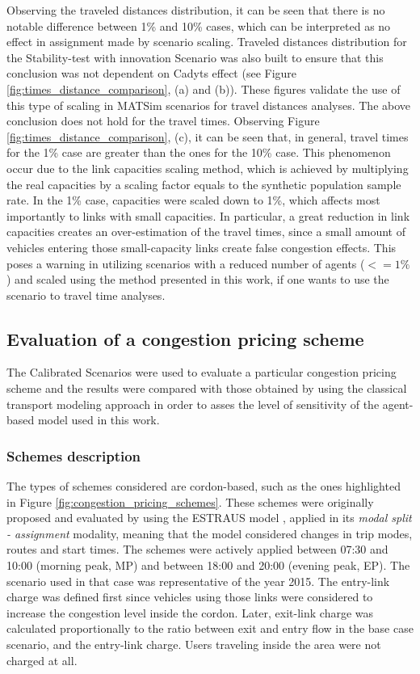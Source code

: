 \documentclass[Journal,letterpaper]{ascelike-new}
\begin{document}
Observing the traveled distances distribution, it can be seen that there is no notable difference between 1\% and 10\% cases, which can be interpreted as no effect in assignment made by scenario scaling. Traveled distances distribution for the Stability-test with innovation Scenario was also built to ensure that this conclusion was not dependent on Cadyts effect (see Figure \ref{fig:times_distance_comparison}, (a) and (b)). These figures validate the use of this type of scaling in MATSim scenarios for travel distances analyses.
The above conclusion does not hold for the travel times. Observing Figure \ref{fig:times_distance_comparison}, (c), it can be seen that, in general, travel times for the 1\% case are greater than the ones for the 10\% case. This phenomenon occur due to the link capacities scaling method, which is achieved by multiplying the real capacities by a scaling factor equals to the synthetic population sample rate. In the 1\% case, capacities were scaled down to 1\%, which affects most importantly to links with small capacities. In particular, a great reduction in link capacities creates an over-estimation of the travel times, since a small amount of vehicles entering those small-capacity links create false congestion effects. This poses a warning in utilizing scenarios with a reduced number of agents ($<=1\%$) and scaled using the method presented in this work, if one wants to use the scenario to travel time analyses.

\subsection{Evaluation of a congestion pricing scheme}

The Calibrated Scenarios were used to evaluate a particular congestion pricing scheme and the results were compared with those obtained by \cite{gleave2009tarificacion} using the classical transport modeling approach in order to asses the level of sensitivity of the agent-based model used in this work.

\subsubsection{Schemes description}
The types of schemes considered are cordon-based, such as the ones highlighted in Figure \ref{fig:congestion_pricing_schemes}. These schemes were originally proposed and evaluated by \cite{gleave2009tarificacion} using the ESTRAUS model \citep{ESTRAUS}, applied in its \emph{modal split - assignment} modality, meaning that the model considered changes in trip modes, routes and start times. The schemes were actively applied between 07:30 and 10:00 (morning peak, MP) and between 18:00 and 20:00 (evening peak, EP). The scenario used in that case was representative of the year 2015. The entry-link charge was defined first since vehicles using those links were considered to increase the congestion level inside the cordon. Later, exit-link charge was calculated proportionally to the ratio between exit and entry flow in the base case scenario, and the entry-link charge. Users traveling inside the area were not charged at all. 
\end{document}
